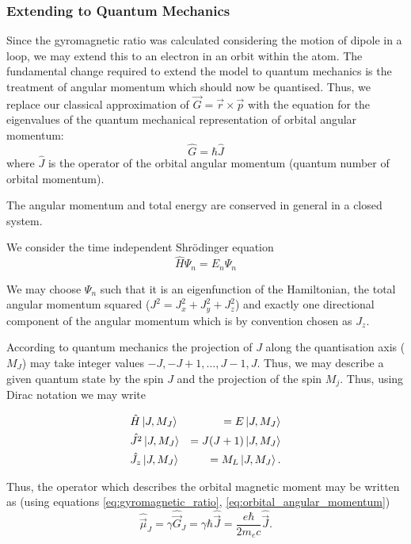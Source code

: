 \subsubsection{Extending to Quantum Mechanics}
Since the gyromagnetic ratio was calculated considering the motion of dipole in a loop, we may extend this to an electron in an orbit within the atom. The fundamental change required to extend the model to quantum mechanics is the treatment of angular momentum which should now be quantised. 
Thus, we replace our classical approximation of $\vec{G} = \vec{r} \times \vec{p}$ with the equation for the eigenvalues of the quantum mechanical representation of orbital angular momentum:
\begin{equation}
    \hat{G} = \hbar \hat{J} 
    \label{eq:orbital_angular_momentum}
\end{equation}
where $\hat{J}$ is the operator of the orbital angular momentum (quantum number of orbital momentum). 


The angular momentum and total energy are conserved in general in a closed system. 

We consider the time independent Shr\"odinger equation
\begin{equation}
    \hat{H} \Psi_n = E_n \Psi_n 
    \label{eq:TISE}
\end{equation}

We may choose $\Psi_n$ such that it is an eigenfunction of the Hamiltonian, the total angular momentum squared ($J^2 = J_x^2 + J_y^2 + J_z^2$) and exactly one directional component of the angular momentum which is by convention chosen as $J_z$.

According to quantum mechanics the projection of $J$ along the quantisation axis ($M_J$) may take integer values $-J, -J + 1, \dots, J-1, J$. 
Thus, we may describe a given quantum state by the spin $J$ and the projection of the spin $M_j$. Thus, using Dirac notation we may write 

\begin{eqnarray}
    &\hat{H}\ket{J, M_J} &= E\ket{J, M_J} \\ 
    &\hat{J^2}\ket{J, M_J} &= J(J+1)\ket{J, M_J} \\ 
    &\hat{J_z}\ket{J, M_J} &= M_L\ket{J, M_J}. \label{eq:zthcomponent} 
\end{eqnarray}

Thus, the operator which describes the orbital magnetic moment may be written as (using equations \ref{eq:gyromagnetic_ratio}, \ref{eq:orbital_angular_momentum})
\begin{equation}
    \hat{\vec{\mu}}_J = \gamma \hat{\vec{G}}_J = \gamma \hbar \hat{\vec{J}} = \frac{e\hbar}{2m_e c}\hat{\vec{J}}.
    \label{eq:orbital_magnetic_moment_operator}
\end{equation}

